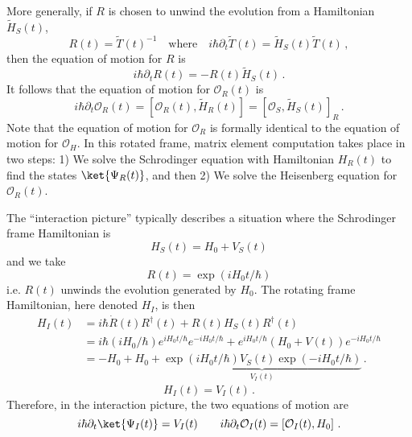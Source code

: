 More generally, if $R$ is chosen to unwind the evolution from a Hamiltonian $\tilde{H}_S(t)$,
\begin{equation}
  R(t) = \tilde{T}(t)^{-1}
  \quad \text{where} \quad
  i \hbar \partial_t \tilde{T}(t) = \tilde{H}_S(t) \tilde{T}(t)
  \, ,
\end{equation}
then the equation of motion for $R$ is
\begin{equation}
  i \hbar \partial_t R(t) = - R(t) \tilde{H}_S(t)
  \, .
\end{equation}
It follows that the equation of motion for $\mathcal{O}_R(t)$ is
\begin{equation}
  i \hbar \partial_t \mathcal{O}_R(t)
  = \left[ \mathcal{O}_R(t), \tilde{H}_R(t) \right]
  = \left[ \mathcal{O}_S, \tilde{H}_S(t) \right]_R
  \, .
\end{equation}
Note that the equation of motion for $\mathcal{O}_R$ is formally identical to the equation of motion for $\mathcal{O}_H$.
In this rotated frame, matrix element computation takes place in two steps: 1) We solve the Schrodinger equation with Hamiltonian $H_R(t)$ to find the states $\ket{\Psi_R(t)}$, and then 2) We solve the Heisenberg equation for $\mathcal{O}_R(t)$.


The ``interaction picture'' typically describes a situation where the Schrodinger frame Hamiltonian is
\begin{equation}
  H_S(t) = H_0 + V_S(t)
\end{equation}
and we take
\begin{equation}
  R(t) = \exp(i H_0 t / \hbar)
\end{equation}
i.e. $R(t)$ unwinds the evolution generated by $H_0$.
The rotating frame Hamiltonian, here denoted $H_I$, is then
\begin{align*}
  H_I(t)
  &= i \hbar \dot{R}(t) R^\dagger(t) + R(t) H_S(t) R^\dagger(t) \\
  &= i \hbar (i H_0 / \hbar) e^{i H_0 t / \hbar} e^{-i H_0 t / \hbar}
    + e^{i H_0 t / \hbar} \left( H_0 + V(t) \right) e^{-i H_0 t/ \hbar} \\
  &= - H_0 + H_0 +
    \underbrace{\exp \left(i H_0 t / \hbar \right) V_S(t) \exp \left(-i H_0 t / \hbar \right)}_{V_I(t)}
  \, .
\end{align*}
\begin{equation}
  H_I(t) = V_I(t) \, .
\end{equation}
Therefore, in the interaction picture, the two equations of motion are
\begin{equation}
  i \hbar \partial_t \ket{\Psi_I(t)} = V_I(t)
  \qquad
  i \hbar \partial_t \mathcal{O}_I(t) = \left[ \mathcal{O}_I(t), H_0 \right]
  \, .
\end{equation}


